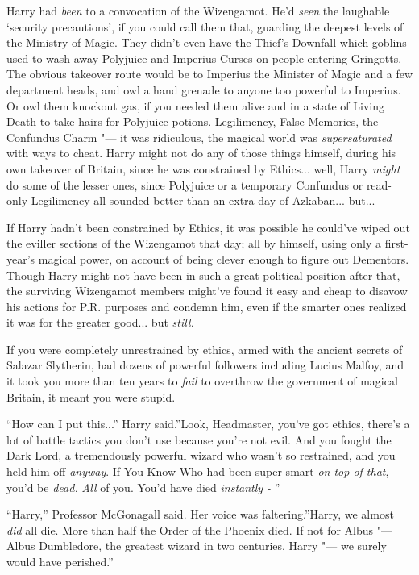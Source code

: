Harry had \emph{been} to a convocation of the Wizengamot. He'd
\emph{seen} the laughable `security precautions', if you could call them
that, guarding the deepest levels of the Ministry of Magic. They didn't
even have the Thief's Downfall which goblins used to wash away Polyjuice
and Imperius Curses on people entering Gringotts. The obvious takeover
route would be to Imperius the Minister of Magic and a few department
heads, and owl a hand grenade to anyone too powerful to Imperius. Or owl
them knockout gas, if you needed them alive and in a state of Living
Death to take hairs for Polyjuice potions. Legilimency, False Memories,
the Confundus Charm "--- it was ridiculous, the magical world was
\emph{supersaturated} with ways to cheat. Harry might not do any of
those things himself, during his own takeover of Britain, since he was
constrained by Ethics... well, Harry \emph{might} do some of the
lesser ones, since Polyjuice or a temporary Confundus or read-only
Legilimency all sounded better than an extra day of Azkaban...
but...

If Harry hadn't been constrained by Ethics, it was possible he could've
wiped out the eviller sections of the Wizengamot that day; all by
himself, using only a first-year's magical power, on account of being
clever enough to figure out Dementors. Though Harry might not have been
in such a great political position after that, the surviving Wizengamot
members might've found it easy and cheap to disavow his actions for P.R.
purposes and condemn him, even if the smarter ones realized it was for
the greater good... but \emph{still.}

If you were completely unrestrained by ethics, armed with the ancient
secrets of Salazar Slytherin, had dozens of powerful followers including
Lucius Malfoy, and it took you more than ten years to \emph{fail} to
overthrow the government of magical Britain, it meant you were stupid.

``How can I put this...'' Harry said.''Look, Headmaster, you've got
ethics, there's a lot of battle tactics you don't use because you're not
evil. And you fought the Dark Lord, a tremendously powerful wizard who
wasn't so restrained, and you held him off \emph{anyway}. If
You-Know-Who had been super-smart \emph{on top of that}, you'd be
\emph{dead.} \emph{All} of you. You'd have died \emph{instantly -} ''

``Harry,'' Professor McGonagall said. Her voice was faltering.''Harry,
we almost \emph{did} all die. More than half the Order of the Phoenix
died. If not for Albus "--- Albus Dumbledore, the greatest wizard in two
centuries, Harry "--- we surely would have perished.''


